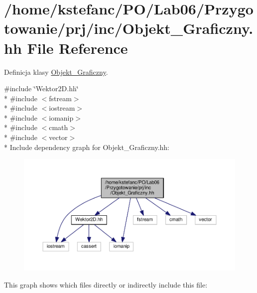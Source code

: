\hypertarget{_objekt___graficzny_8hh}{\section{/home/kstefanc/\+P\+O/\+Lab06/\+Przygotowanie/prj/inc/\+Objekt\+\_\+\+Graficzny.hh File Reference}
\label{_objekt___graficzny_8hh}
}


Definicja klasy \hyperlink{class_objekt___graficzny}{Objekt\+\_\+\+Graficzny}.  


{\ttfamily \#include \char`\"{}Wektor2\+D.\+hh\char`\"{}}\\*
{\ttfamily \#include $<$fstream$>$}\\*
{\ttfamily \#include $<$iostream$>$}\\*
{\ttfamily \#include $<$iomanip$>$}\\*
{\ttfamily \#include $<$cmath$>$}\\*
{\ttfamily \#include $<$vector$>$}\\*
Include dependency graph for Objekt\+\_\+\+Graficzny.\+hh\+:
\nopagebreak
\begin{figure}[H]
\begin{center}
\leavevmode
\includegraphics[width=350pt]{_objekt___graficzny_8hh__incl}
\end{center}
\end{figure}
This graph shows which files directly or indirectly include this file\+:
\nopagebreak
